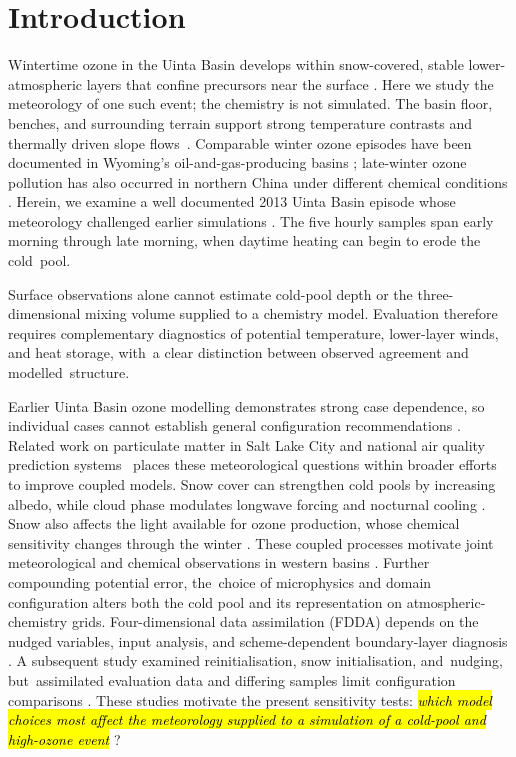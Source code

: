 \documentclass[air,article,accept,moreauthors]{Definitions/mdpi}
\begin{document}
\section{Introduction}
\label{sec:v3-introduction}

Wintertime ozone in the Uinta Basin develops within snow-covered, stable lower-atmospheric layers that confine precursors near the surface \citep{Ahmadov2015Complete,Neemann2015-ws,Davies2025-wy}.
Here we study the meteorology of one such event; the chemistry is not simulated.
The basin floor, benches, and surrounding terrain support strong temperature contrasts and thermally driven slope flows~\citep{Lyman2015-aq,Whiteman2000}.
Comparable winter ozone episodes have been documented in Wyoming's oil-and-gas-producing basins \citep{Schnell2009-pe,Oltmans2014-md}; late-winter ozone pollution has also occurred in northern China under different chemical conditions \citep{Li2021-xk}.
Herein, we examine a well documented 2013 Uinta Basin episode whose meteorology challenged earlier simulations \citep{Neemann2015-ws,Matichuk2017-bq,Tran2018FDDA}.
The five hourly samples span early morning through late morning, when daytime heating can begin to erode the cold~pool.

Surface observations alone cannot estimate cold-pool depth or the three-dimensional mixing volume supplied to a chemistry model.
Evaluation therefore requires complementary diagnostics of potential temperature, lower-layer winds, and heat storage, with~a clear distinction between observed agreement and modelled~structure.

Earlier Uinta Basin ozone modelling demonstrates strong case dependence, so individual cases cannot establish general configuration recommendations \citep{Neemann2015-ws,Matichuk2017-bq,Tran2018FDDA}.
Related work on particulate matter in Salt Lake City \citep{Ivey2019-wn} and national air quality prediction systems~\citep{Stajner2022-uw,Huang2025-kv} places these meteorological questions within broader efforts to improve coupled models.
Snow cover can strengthen cold pools by increasing albedo, while cloud phase modulates longwave forcing and nocturnal cooling \citep{Neemann2015-ws}.
Snow also affects the light available for ozone production, whose chemical sensitivity changes through the winter \citep{Mansfield2025Seasonal}.
These coupled processes motivate joint meteorological and chemical observations in western basins \citep{Hallar2021-yt}.
Further compounding potential error, the~choice of microphysics and domain configuration alters both the cold pool and its representation on atmospheric-chemistry grids.
Four-dimensional data assimilation (FDDA) depends on the nudged variables, input analysis, and scheme-dependent boundary-layer diagnosis \citep{Tran2018FDDA}.
A subsequent study examined reinitialisation, snow initialisation, and~nudging, but~assimilated evaluation data and differing samples limit configuration comparisons \citep{Tran2021WRFEvaluation}.
These studies motivate the present sensitivity tests: \textit{\hl{which model choices most affect the meteorology supplied to a simulation of a cold-pool and high-ozone event}%
}?
\end{document}
